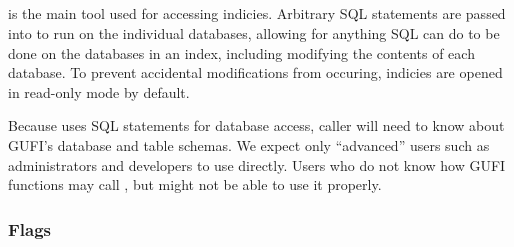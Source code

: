\subsection{\gufiquery}

\gufiquery is the main tool used for accessing indicies. Arbitrary SQL
statements are passed into \gufiquery to run on the individual
databases, allowing for anything SQL can do to be done on the
databases in an index, including modifying the contents of each
database. To prevent accidental modifications from occuring, indicies
are opened in read-only mode by default.

Because \gufiquery uses SQL statements for database access, caller
will need to know about GUFI's database and table schemas. We expect
only ``advanced'' users such as administrators and developers to use
\gufiquery directly. Users who do not know how GUFI functions may call
\gufiquery, but might not be able to use it properly.

\subsubsection{Flags}

